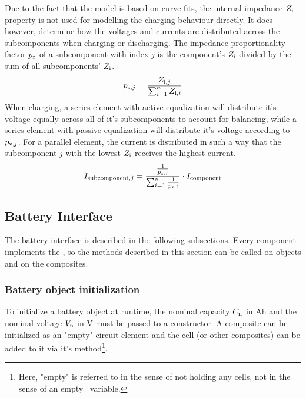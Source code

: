 Due to the fact that the model is based on curve fits, the internal impedance $Z_\text{i}$ property is not used for modelling the charging behaviour directly. It does however, determine how the voltages and currents are distributed across the subcomponents when charging or discharging. The impedance proportionality factor $p_\text{z}$ of a subcomponent with index $j$ is the component's $Z_\text{i}$ divided by the sum of all subcomponents' $Z_\text{i}$.
\begin{equation}
p_{\text{z}, j} = \frac{Z_{\text{i}, j}}{\sum_{i=1}^{n}Z_{\text{i}, i}}
\end{equation}
When charging, a series element with active equalization will distribute it's voltage equally across all of it's subcomponents to account for balancing, while a series element with passive equalization will distribute it's voltage according to $p_{\text{z}, j}$. For a parallel element, the current is distributed in such a way that the subcomponent $j$ with the lowest $Z_\text{i}$ receives the highest current.
\begin{equation}
I_{\text{subcomponent}, j} = \frac{\frac{1}{p_{\text{z}, j}}}{\sum_{i=1}^{n}\frac{1}{p_{\text{z}, i}}}
\cdot I_\text{component}
\end{equation}


\subsection{Battery Interface}
\label{sec:batteryInterface}
The battery interface is described in the following subsections. Every component implements the , so the methods described in this section can be called on  objects and on the composites.

\subsubsection{Battery object initialization}
To initialize a battery object at runtime, the nominal capacity $C_\text{n}$ in Ah and the nominal voltage $V_\text{n}$ in V must be passed to a  constructor. A composite can be initialized as an "empty" circuit element and the cell (or other composites) can be added to it via it's  method\footnote{Here, "empty" is referred to in the sense of not holding any cells, not in the sense of an empty \matlab\ variable.}.

